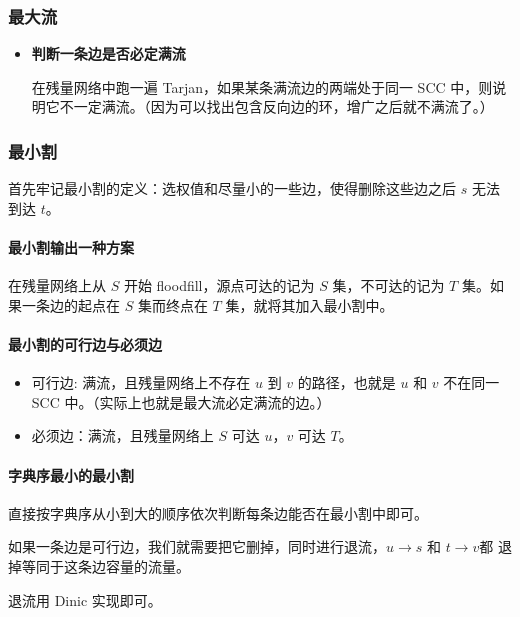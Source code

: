 \subsubsection{最大流}

\begin{itemize}

\item \textbf{判断一条边是否必定满流}

在残量网络中跑一遍 Tarjan，如果某条满流边的两端处于同一 SCC 中，则说明它不一定满流。（因为可以找出包含反向边的环，增广之后就不满流了。）

\end{itemize}

\subsubsection{最小割}

首先牢记最小割的定义：选权值和尽量小的一些边，使得删除这些边之后 $s$ 无法到达 $t$。

\paragraph{最小割输出一种方案}
在残量网络上从 $S$ 开始 floodfill，源点可达的记为 $S$ 集，不可达的记为 $T$ 集。如果一条边的起点在 $S$ 集而终点在 $T$ 集，就将其加入最小割中。

\paragraph{最小割的可行边与必须边}
\begin{itemize}
	\item 可行边: 满流，且残量网络上不存在 $u$ 到 $v$ 的路径，也就是 $u$ 和 $v$ 不在同一 SCC 中。（实际上也就是最大流必定满流的边。）

	\item 必须边：满流，且残量网络上 $S$ 可达 $u$，$v$ 可达 $T$。
\end{itemize}

\paragraph{字典序最小的最小割}
直接按字典序从小到大的顺序依次判断每条边能否在最小割中即可。

如果一条边是可行边，我们就需要把它删掉，同时进行退流，$u\to s$ 和 $t\to v$都 退掉等同于这条边容量的流量。

退流用 Dinic 实现即可。

